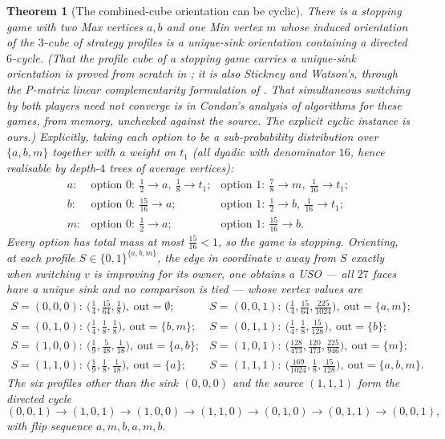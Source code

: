 \documentclass[11pt]{article}
\theoremstyle{plain}
\newtheorem{theorem}{Theorem}[section]
\theoremstyle{definition}
\begin{document}
\begin{theorem}[The combined-cube orientation can be cyclic]\label{thm:cyclic-uso}
There is a stopping game with two Max vertices $a,b$ and one Min vertex
$m$ whose induced orientation of the $3$-cube of strategy profiles is a
unique-sink orientation containing a directed $6$-cycle. (That the
profile cube of a stopping game carries a unique-sink orientation is
proved from scratch in ; it is also Stickney and
Watson's, through the P-matrix linear complementarity formulation of
. That simultaneous switching by both players need not
converge is in Condon's analysis of algorithms for these games, from
memory, unchecked against the source. The explicit cyclic instance is
ours.) Explicitly,
taking each option to be a sub-probability distribution over
$\{a,b,m\}$ together with a weight on $t_1$ (all dyadic with denominator
$16$, hence realisable by depth-$4$ trees of average vertices):
\[
\begin{array}{llll}
  a: &\text{option }0:\ \tfrac12\!\to\!a,\ \tfrac18\!\to\!t_1;
     &\text{option }1:\ \tfrac78\!\to\!m,\ \tfrac1{16}\!\to\!t_1;\\
  b: &\text{option }0:\ \tfrac{15}{16}\!\to\!a;
     &\text{option }1:\ \tfrac12\!\to\!b,\ \tfrac1{16}\!\to\!t_1;\\
  m: &\text{option }0:\ \tfrac12\!\to\!a;
     &\text{option }1:\ \tfrac{15}{16}\!\to\!b.
\end{array}
\]
Every option has total mass at most $\tfrac{15}{16}<1$, so the game is
stopping. Orienting, at each profile $S\in\{0,1\}^{\{a,b,m\}}$, the edge
in coordinate $v$ away from $S$ exactly when switching $v$ is improving
for its owner, one obtains a USO --- all $27$ faces have a unique sink
and no comparison is tied --- whose vertex values are
\[
\begin{array}{ll}
  S=(0,0,0):\ \bigl(\tfrac14,\tfrac{15}{64},\tfrac18\bigr),\ \text{out}=\emptyset;
  & S=(0,0,1):\ \bigl(\tfrac14,\tfrac{15}{64},\tfrac{225}{1024}\bigr),\ \text{out}=\{a,m\};\\
  S=(0,1,0):\ \bigl(\tfrac14,\tfrac18,\tfrac18\bigr),\ \text{out}=\{b,m\};
  & S=(0,1,1):\ \bigl(\tfrac14,\tfrac18,\tfrac{15}{128}\bigr),\ \text{out}=\{b\};\\
  S=(1,0,0):\ \bigl(\tfrac19,\tfrac5{48},\tfrac1{18}\bigr),\ \text{out}=\{a,b\};
  & S=(1,0,1):\ \bigl(\tfrac{128}{473},\tfrac{120}{473},\tfrac{225}{946}\bigr),\ \text{out}=\{m\};\\
  S=(1,1,0):\ \bigl(\tfrac19,\tfrac18,\tfrac1{18}\bigr),\ \text{out}=\{a\};
  & S=(1,1,1):\ \bigl(\tfrac{169}{1024},\tfrac18,\tfrac{15}{128}\bigr),\ \text{out}=\{a,b,m\}.
\end{array}
\]
The six profiles other than the sink $(0,0,0)$ and the source $(1,1,1)$
form the directed cycle
\[
  (0,0,1)\to(1,0,1)\to(1,0,0)\to(1,1,0)\to(0,1,0)\to(0,1,1)\to(0,0,1),
\]
with flip sequence $a,m,b,a,m,b$.
\end{theorem}
\end{document}
